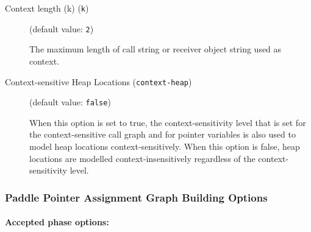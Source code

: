 \documentclass{article}
\begin{document}
\begin{description}
\begin{longtable}{p{1in}p{4in}}
\end{longtable}


\item[Context length (k) ({\tt k})]
(default value: {\tt 2})




                                        The maximum length of call string or receiver object string used as context.
                


\item[Context-sensitive Heap Locations ({\tt context-heap})]
(default value: {\tt false})




When this option is set to true, the context-sensitivity level that is set
for the context-sensitive call graph and for pointer variables is also used
to model heap locations context-sensitively. When this option is false,
heap locations are modelled context-insensitively regardless of the
context-sensitivity level.
        


\end{description}

\subsubsection{Paddle Pointer Assignment Graph Building Options}


\paragraph{Accepted phase options:} 
\end{document}
